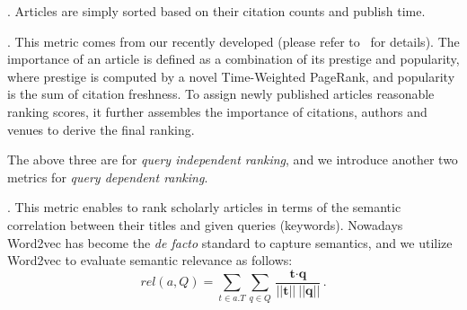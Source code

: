 




. Articles are simply sorted based on their citation counts and publish time. %


. This metric comes from our recently developed \sarank (please refer to~\cite{ma2018query} for details). The importance of an article is defined as a combination of its prestige and popularity, where prestige is computed by a novel Time-Weighted PageRank, and popularity is the sum of citation freshness. To assign newly published articles reasonable ranking scores, it further assembles the importance of citations, authors and venues to derive the final ranking. %

The above three are for {\em query independent ranking}, and we introduce another two metrics for {\em query dependent ranking}.

. This metric enables to rank scholarly articles in terms of the semantic correlation between their titles and given queries (keywords). Nowadays Word2vec \cite{corrado2013efficient} has become the {\em de facto} standard to capture semantics, and we  utilize Word2vec to evaluate semantic relevance as follows:
%
%
\begin{equation}
\label{eq:relscore}
rel(a, Q) = \sum_{t \in a.T} \sum_{q \in Q} \frac {\textbf{t} \cdot \textbf{q}} {|| \textbf{t} ||\ ||\textbf{q}||}.
\end{equation}

